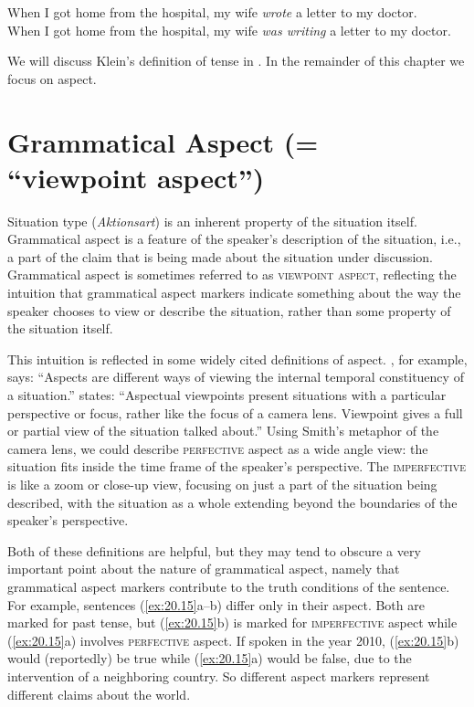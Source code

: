 \ea \label{ex:20.14}
\ea  When I got home from the hospital, my wife \textit{wrote} a letter to my doctor.\\
\ex When I got home from the hospital, my wife \textit{was writing} a letter to my doctor.
                       \z
\z


We will discuss Klein’s definition of tense in . In the remainder of this chapter we focus on aspect.


\section{Grammatical Aspect (= “viewpoint aspect”)}\label{sec:20.4} 

Situation type (\textit{Aktionsart}) is an inherent property of the situation itself. Grammatical aspect is a feature of the speaker’s description of the situation, i.e., a part of the claim that is being made about the situation under discussion. Grammatical aspect is sometimes referred to as \textsc{viewpoint aspect}, reflecting the intuition that grammatical aspect markers indicate something about the way the speaker chooses to view or describe the situation, rather than some property of the situation itself.



This intuition is reflected in some widely cited definitions of aspect. \citet[3]{Comrie1976}, for example, says: “Aspects are different ways of viewing the internal temporal constituency of a situation.” \citet[2--3]{Smith1991/1997} states: “Aspectual viewpoints present situations with a particular perspective or focus, rather like the focus of a camera lens. Viewpoint gives a full or partial view of the situation talked about.” Using Smith’s metaphor of the camera lens, we could describe \textsc{perfective} aspect as a wide angle view: the situation fits inside the time frame of the speaker’s perspective. The \textsc{imperfective} is like a zoom or close-up view, focusing on just a part of the situation being described, with the situation as a whole extending beyond the boundaries of the speaker’s perspective.



Both of these definitions are helpful, but they may tend to obscure a very important point about the nature of grammatical aspect, namely that grammatical aspect markers contribute to the truth conditions of the sentence. For example, sentences (\ref{ex:20.15}a--b) differ only in their aspect. Both are marked for past tense, but (\ref{ex:20.15}b) is marked for \textsc{imperfective} aspect while (\ref{ex:20.15}a) involves \textsc{perfective} aspect. If spoken in the year 2010, (\ref{ex:20.15}b) would (reportedly) be true while (\ref{ex:20.15}a) would be false, due to the intervention of a neighboring country. So different aspect markers represent different claims about the world.


